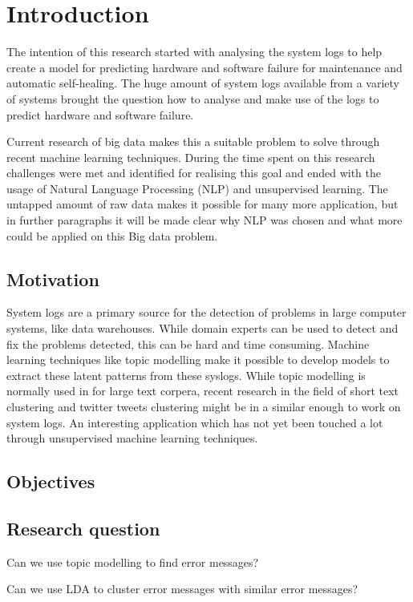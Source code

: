 \chapter{Introduction} \label{ch:introduction}
The intention of this research started with analysing the system logs to help create a model for predicting hardware and software failure for maintenance and automatic self-healing. The huge amount of system logs available from a variety of systems brought the question how to analyse and make use of the logs to predict hardware and software failure.

Current research of big data makes this a suitable problem to solve through recent machine learning techniques. 
During the time spent on this research challenges were met and identified for realising this goal and ended with the usage of Natural Language Processing (NLP) and unsupervised learning.  The untapped amount of raw data makes it possible for many more application, but in further paragraphs it will be made clear why NLP was chosen and what more could be applied on this Big data problem.
 
 
\section{Motivation}
System logs are a primary source for the detection of problems in large computer systems, like data warehouses. While domain experts can be used to detect and fix the problems detected, this can be hard and time consuming. Machine learning techniques like topic modelling make it possible to develop models to extract these latent patterns from these syslogs. While topic modelling is normally used in for large text corpera, recent research in the field of short text clustering and twitter tweets clustering might be in a similar enough to work on system logs. An interesting application which has not yet been touched a lot through unsupervised machine learning techniques.

\section{Objectives}


\section{Research question}
Can we use topic modelling to find error messages?

Can we use LDA to cluster error messages with similar error messages?

